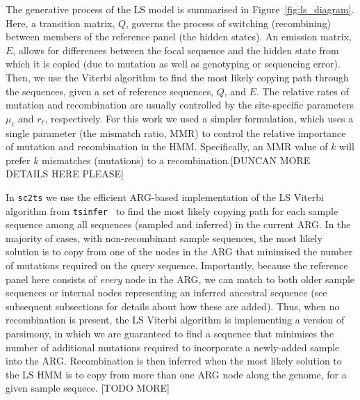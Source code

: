 \documentclass{article}
\begin{document}
The generative process of the LS model is summarised in
Figure~\ref{fig:ls_diagram}. Here, a transition matrix, $Q$, governs the
process of switching (recombining) between members of the reference panel (the
hidden states). An emission matrix, $E$, allows for differences between the
focal sequence and the hidden state from which it is copied (due to mutation as
well as genotyping or sequencing error). Then, we use the Viterbi algorithm
\citep{Viterbi1967-ol} to find the most likely copying path through the
sequences, given a set of reference sequences, $Q$, and $E$.
The relative rates of mutation and recombination are usually controlled by
the site-specific parameters $\mu_\ell$ and $r_\ell$, respectively.
For this work we used a simpler formulation, which uses a single parameter
(the mismatch ratio, MMR) to control the relative importance of mutation
and recombination in the HMM. Specifically, an MMR value of $k$ will
prefer $k$ mismatches (mutations) to a recombination.[DUNCAN MORE DETAILS
HERE PLEASE]


In \texttt{sc2ts} we use the efficient ARG-based implementation of the
LS Viterbi algorithm from \texttt{tsinfer}~\citep{Kelleher2019-ba} to find
the most likely copying path for each sample sequence
among all sequences (sampled and inferred) in the current ARG.
In the majority of cases, with non-recombinant sample sequences,
the most likely solution is to copy from one
of the nodes in the ARG that minimised the number of mutations required
on the query sequence. Importantly, because the reference panel here consists of
\emph{every} node in the ARG, we can match to both older sample
sequences or internal nodes representing an inferred ancestral sequence
(see subsequent subsections for details about how these are added).
Thus, when no recombination is present, the LS Viterbi algorithm is
implementing a version of parsimony, in which we are guaranteed to
find a sequence that minimises the number of additional mutations required
to incorporate a newly-added sample into the ARG.
Recombination is then inferred when the most likely solution to the LS
HMM is to copy from more than one ARG node along the genome, for a
given sample sequece. [TODO MORE]
\end{document}
